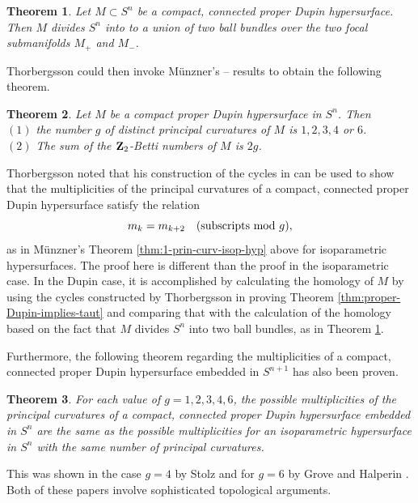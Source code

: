 \documentclass[12pt]{article}
\newtheorem{theorem}{Theorem}[section]
\begin{document}
{\begin{theorem}
\label{thm:dupin-ball-bundle} 
Let $M \subset S^n$ be a compact, connected proper Dupin hypersurface. Then
$M$ divides $S^n$ into to a union of two ball bundles over the two focal
submanifolds $M_+$ and $M_-$.  
\end{theorem}


Thorbergsson could then invoke M\"{u}nzner's 
\cite{Mu}--\cite{Mu2} results to obtain the following theorem. 

\begin{theorem}
\label{thm:dupin-restriction-g}
Let $M$ be a compact proper Dupin hypersurface in $S^n$.
Then\\
$(1)$ the number $g$ of distinct principal curvatures of $M$ is
$1,2,3,4$ or $6$.\\
$(2)$ The sum of the ${\bf Z}_2$-Betti numbers of $M$ is $2g$.
\end{theorem}



Thorbergsson \cite[p. 980]{Th6} noted that his construction of the cycles in \cite{Th1}
can be used to show that the multiplicities of the principal curvatures of a compact, 
connected proper Dupin hypersurface
satisfy the relation
 \begin{equation}
 \label{eq:subscripts-dupin}
 m_k = m_{k+2} \quad {\rm (subscripts\  mod}\  g),
 \end{equation}
 as in M\"{u}nzner's Theorem \ref{thm:1-prin-curv-isop-hyp} above for isoparametric hypersurfaces.  The proof here
 is different than the proof in the isoparametric case.  In the Dupin case,
it is accomplished by calculating the homology of $M$ by using the cycles constructed by Thorbergsson 
in proving Theorem \ref{thm:proper-Dupin-implies-taut} and comparing
that with the calculation of the homology based on the fact that $M$ divides $S^n$ into two ball bundles,
as in Theorem \ref{thm:dupin-ball-bundle}. 

Furthermore, the following theorem regarding the multiplicities of a compact, connected proper Dupin hypersurface embedded in $S^{n+1}$ has also been proven.
\begin{theorem}
\label{thm:mult-compact-Dupin}
For each value of $g = 1,2,3,4,6$, the possible multiplicities of 
the principal curvatures of a
compact, connected proper Dupin hypersurface embedded in $S^n$ are the same as the possible multiplicities
for an isoparametric hypersurface in $S^n$ with the same number of principal curvatures.
\end{theorem}
This was shown in the case $g=4$ by Stolz \cite{Stolz} and for
$g=6$ by Grove and Halperin \cite{GH}. Both of these papers involve sophisticated topological arguments.

}
\end{document}
